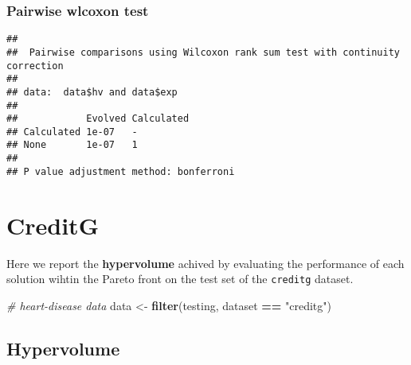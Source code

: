 \documentclass[
]{book}
\newenvironment{Shaded}{\begin{snugshade}}{\end{snugshade}}
\newcommand{\AttributeTok}[1]{\textcolor[rgb]{0.13,0.29,0.53}{#1}}
\newcommand{\CommentTok}[1]{\textcolor[rgb]{0.56,0.35,0.01}{\textit{#1}}}
\newcommand{\ConstantTok}[1]{\textcolor[rgb]{0.56,0.35,0.01}{#1}}
\newcommand{\FunctionTok}[1]{\textcolor[rgb]{0.13,0.29,0.53}{\textbf{#1}}}
\newcommand{\NormalTok}[1]{#1}
\newcommand{\OtherTok}[1]{\textcolor[rgb]{0.56,0.35,0.01}{#1}}
\newcommand{\SpecialCharTok}[1]{\textcolor[rgb]{0.81,0.36,0.00}{\textbf{#1}}}
\newcommand{\StringTok}[1]{\textcolor[rgb]{0.31,0.60,0.02}{#1}}
\begin{document}
\hypertarget{pairwise-wlcoxon-test-2}{%
\subsection{Pairwise wlcoxon test}\label{pairwise-wlcoxon-test-2}}

\begin{Shaded}
\end{Shaded}

\begin{verbatim}
## 
##  Pairwise comparisons using Wilcoxon rank sum test with continuity correction 
## 
## data:  data$hv and data$exp 
## 
##            Evolved Calculated
## Calculated 1e-07   -         
## None       1e-07   1         
## 
## P value adjustment method: bonferroni
\end{verbatim}

\hypertarget{creditg}{%
\chapter{CreditG}\label{creditg}}

Here we report the \textbf{hypervolume} achived by evaluating the performance of each solution wihtin the Pareto front on the test set of the \texttt{creditg} dataset.

\begin{Shaded}
\begin{Highlighting}[]
\CommentTok{\# heart{-}disease data}
\NormalTok{data }\OtherTok{\textless{}{-}} \FunctionTok{filter}\NormalTok{(testing, dataset }\SpecialCharTok{==} \StringTok{"creditg"}\NormalTok{)}
\end{Highlighting}
\end{Shaded}

\hypertarget{hypervolume-3}{%
\section{Hypervolume}\label{hypervolume-3}}
\end{document}
